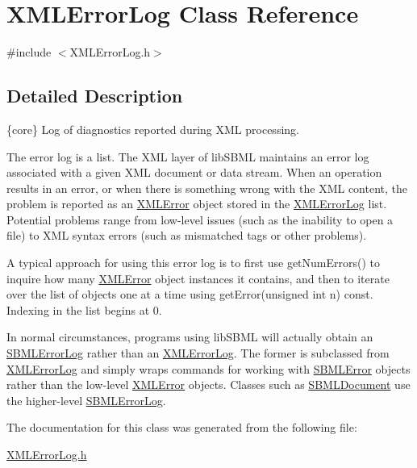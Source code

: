 \hypertarget{class_x_m_l_error_log}{}\section{X\+M\+L\+Error\+Log Class Reference}
\label{class_x_m_l_error_log}


{\ttfamily \#include $<$X\+M\+L\+Error\+Log.\+h$>$}



\subsection{Detailed Description}
\{core\} Log of diagnostics reported during X\+ML processing.



The error log is a list. The X\+ML layer of lib\+S\+B\+ML maintains an error log associated with a given X\+ML document or data stream. When an operation results in an error, or when there is something wrong with the X\+ML content, the problem is reported as an \hyperlink{class_x_m_l_error}{X\+M\+L\+Error} object stored in the \hyperlink{class_x_m_l_error_log}{X\+M\+L\+Error\+Log} list. Potential problems range from low-\/level issues (such as the inability to open a file) to X\+ML syntax errors (such as mismatched tags or other problems).

A typical approach for using this error log is to first use get\+Num\+Errors() to inquire how many \hyperlink{class_x_m_l_error}{X\+M\+L\+Error} object instances it contains, and then to iterate over the list of objects one at a time using get\+Error(unsigned int n) const. Indexing in the list begins at 0.

In normal circumstances, programs using lib\+S\+B\+ML will actually obtain an \hyperlink{class_s_b_m_l_error_log}{S\+B\+M\+L\+Error\+Log} rather than an \hyperlink{class_x_m_l_error_log}{X\+M\+L\+Error\+Log}. The former is subclassed from \hyperlink{class_x_m_l_error_log}{X\+M\+L\+Error\+Log} and simply wraps commands for working with \hyperlink{class_s_b_m_l_error}{S\+B\+M\+L\+Error} objects rather than the low-\/level \hyperlink{class_x_m_l_error}{X\+M\+L\+Error} objects. Classes such as \hyperlink{class_s_b_m_l_document}{S\+B\+M\+L\+Document} use the higher-\/level \hyperlink{class_s_b_m_l_error_log}{S\+B\+M\+L\+Error\+Log}. 

The documentation for this class was generated from the following file\+:\begin{DoxyCompactItemize}
\item 
\hyperlink{_x_m_l_error_log_8h}{X\+M\+L\+Error\+Log.\+h}\end{DoxyCompactItemize}
